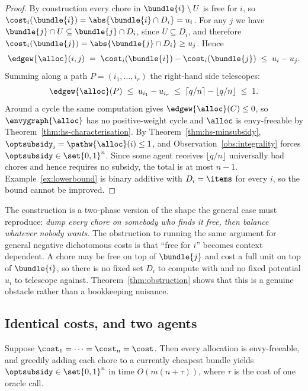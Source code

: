 \begin{proof}
By construction every chore in $\bundle{i} \setminus U$ is free for $i$, so
$\cost_i(\bundle{i}) = \abs{\bundle{i} \cap D_i} = u_i$. For any $j$ we have
$\bundle{j} \cap U \subseteq \bundle{j} \cap D_i$, since $U \subseteq D_i$, and
therefore $\cost_i(\bundle{j}) = \abs{\bundle{j} \cap D_i} \ge u_j$. Hence
\[
  \edgew{\alloc}(i,j) \;=\; \cost_i(\bundle{i}) - \cost_i(\bundle{j})
  \;\le\; u_i - u_j .
\]
Summing along a path $P = (i_1, \dots, i_r)$ the right-hand side telescopes:
\[
  \edgew{\alloc}(P) \;\le\; u_{i_1} - u_{i_r}
  \;\le\; \lceil q/n \rceil - \lfloor q/n \rfloor \;\le\; 1 .
\]
Around a cycle the same computation gives $\edgew{\alloc}(C) \le 0$, so
$\envygraph{\alloc}$ has no positive-weight cycle and $\alloc$ is envy-freeable
by Theorem~\ref{thm:hs-characterisation}. By Theorem~\ref{thm:hs-minsubsidy},
$\optsubsidy_i = \pathw{\alloc}(i) \le 1$, and
Observation~\ref{obs:integrality} forces $\optsubsidy \in \set{0,1}^n$. Since
some agent receives $\lfloor q/n \rfloor$ universally bad chores and hence
requires no subsidy, the total is at most $n-1$. Example~\ref{ex:lowerbound} is
binary additive with $D_i = \items$ for every $i$, so the bound cannot be
improved.
\end{proof}

The construction is a two-phase version of the shape the general case must
reproduce: \emph{dump every chore on somebody who finds it free, then balance
whatever nobody wants}. The obstruction to running the same argument for general
negative dichotomous costs is that ``free for $i$'' becomes context dependent. A
chore may be free on top of $\bundle{j}$ and cost a full unit on top of
$\bundle{i}$, so there is no fixed set $D_i$ to compute with and no fixed
potential $u_i$ to telescope against. Theorem~\ref{thm:obstruction} shows that
this is a genuine obstacle rather than a bookkeeping nuisance.

\subsection{Identical costs, and two agents}
\label{sec:identical}

\begin{theorem}
\label{thm:identical}
Suppose $\cost_1 = \dots = \cost_n = \cost$. Then every allocation is
envy-freeable, and greedily adding each chore to a currently cheapest bundle
yields $\optsubsidy \in \set{0,1}^n$ in time $O(m(n + \tau))$, where $\tau$ is
the cost of one oracle call.
\end{theorem}

